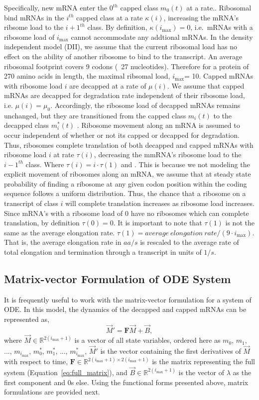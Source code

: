 \documentclass[review]{elsarticle}
\newcommand{\imax}{\ensuremath{{i_{\max}}}\xspace}
\let\bs\boldsymbol
\begin{document}
Specifically, new mRNA enter the $0^{th}$ capped class $m_0(t)$ at a rate..
Ribosomal bind mRNAs in the $i^{th}$ capped class at a rate $\kappa(i)$, increasing the mRNA's ribsome load to the $i+1^{th}$ class.
By definition, $\kappa(\imax)= 0$, i.e.~mRNAs with a ribosome load of \imax cannot accommodate any addtional mRNAs.
In the density independent model (DII), we assume that the current ribosomal load has no effect on the ability of another ribosome to bind to the transcript. 
An average ribosomal footprint covers 9 codons (~27 nucleotides). Therefore for a protein of 270 amino acids in length, the maximal ribsomal load, \imax = 10.
Capped mRNAs with ribosome load $i$ are decapped at a rate of $\mu(i)$.
We assume that capped mRNAs are decapped for degradation rate independent of their ribosome load, i.e. $\mu(i)=\mu_0$.
Accordingly, the ribosome load of decapped mRNAs remains unchanged, but they are transitioned from the capped class $m_i(t)$ to the decapped class $m_i^*(t)$ .
Ribosome movement along an mRNA is assumed to occur independent of whether or not its capped or decapped for degradation.
Thus, ribosomes complete translation of both decapped and capped mRNAs with ribosome load $i$ at rate $\tau(i)$, decreasing the mmRNA's ribosome load to the $i-1^{th}$ class. %
Where $\tau(i)= i \cdot \tau(1)$ and .
This is because we not modeling the explicit movement of ribosomes along an mRNA, we assume that at steady state probability of finding a ribosome at any given codon position within the coding sequence follows a uniform distribution.
Thus, the chance that a ribosome on a transcript of class $i$ will complete translation increases as ribosome load increases.  
Since mRNA's with a ribosome load of 0 have no ribosomes which can complete translation, by definition $\tau(0) = 0$.
It is important to note that $\tau(1)$ is not the same as the average elongation rate. $\tau(1) = average \: elongation \: rate/(9 \cdot \imax)$. 
That is, the average elongation rate in $aa/s$ is rescaled to the average rate of total elongation and termination through a transcript in units of $1/s$.


\subsection{Matrix-vector Formulation of ODE System}
It is frequently useful to work with the matrix-vector formulation for a system of ODE.
In this model, the dynamics of the decapped and capped mRNAs can be represented as,
\begin{equation}
\vec{M}'=\boldsymbol{F}\vec{M}+\vec{B},
\end{equation} 
where $\vec{M}\in\mathbb{R}^{2(\imax+1)}$ is a vector of all state variables, ordered here as $m_0$, $m_1$, ..., $m_{\imax}$, $m^*_0$, $m^*_1$, ..., $m^*_{\imax}$, $\vec{M}'$ is the vector containing the first derivatives of $\vec{M}$ with respect to time, $\bs{F}\in\mathbb{R}^{2(\imax+1)\times 2(\imax+1)}$ is the matrix representing the full system (Equation~\ref{eq:full_matrix}), and $\vec{B}\in\mathbb{R}^{2(\imax+1)}$ is the vector of $\lambda$ as the first component and 0s else.
Using the functional forms presented above, matrix formulations are provided next.
\end{document}
